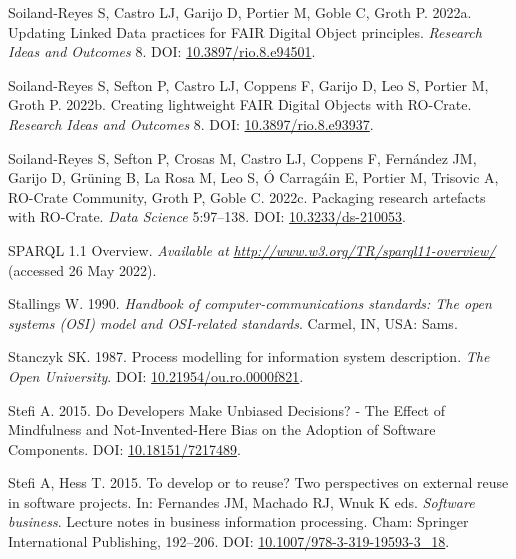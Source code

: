 \begin{CSLReferences}{1}{0}
\leavevmode{}%
Soiland-Reyes S, Castro LJ, Garijo D, Portier M, Goble C, Groth P. 2022a. Updating Linked Data practices for FAIR Digital Object principles. \emph{Research Ideas and Outcomes} 8. DOI: \href{https://doi.org/10.3897/rio.8.e94501}{10.3897/rio.8.e94501}.

\leavevmode{}%
Soiland-Reyes S, Sefton P, Castro LJ, Coppens F, Garijo D, Leo S, Portier M, Groth P. 2022b. Creating lightweight FAIR Digital Objects with RO-Crate. \emph{Research Ideas and Outcomes} 8. DOI: \href{https://doi.org/10.3897/rio.8.e93937}{10.3897/rio.8.e93937}.

\leavevmode{}%
Soiland-Reyes S, Sefton P, Crosas M, Castro LJ, Coppens F, Fernández JM, Garijo D, Grüning B, La Rosa M, Leo S, Ó Carragáin E, Portier M, Trisovic A, RO-Crate Community, Groth P, Goble C. 2022c. Packaging research artefacts with RO-Crate. \emph{Data Science} 5:97--138. DOI: \href{https://doi.org/10.3233/ds-210053}{10.3233/ds-210053}.

\leavevmode{}%
SPARQL 1.1 Overview. \emph{Available at} \href{http://www.w3.org/TR/sparql11-overview/}{\emph{http://www.w3.org/TR/sparql11-overview/}} (accessed 26 May 2022).

\leavevmode{}%
Stallings W. 1990. \emph{Handbook of computer-communications standards: The open systems (OSI) model and OSI-related standards}. Carmel, IN, USA: Sams.

\leavevmode{}%
Stanczyk SK. 1987. Process modelling for information system description. \emph{The Open University}. DOI: \href{https://doi.org/10.21954/ou.ro.0000f821}{10.21954/ou.ro.0000f821}.

\leavevmode{}%
Stefi A. 2015. Do Developers Make Unbiased Decisions? - The Effect of Mindfulness and Not-Invented-Here Bias on the Adoption of Software Components. DOI: \href{https://doi.org/10.18151/7217489}{10.18151/7217489}.

\leavevmode{}%
Stefi A, Hess T. 2015. To develop or to reuse? Two perspectives on external reuse in software projects. In: Fernandes JM, Machado RJ, Wnuk K eds. \emph{Software business}. Lecture notes in business information processing. Cham: Springer International Publishing, 192--206. DOI: \href{https://doi.org/10.1007/978-3-319-19593-3_18}{10.1007/978-3-319-19593-3\_18}.


\end{CSLReferences}

